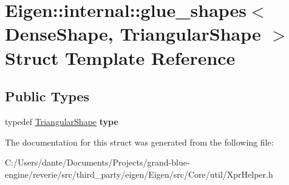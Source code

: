 \hypertarget{struct_eigen_1_1internal_1_1glue__shapes_3_01_dense_shape_00_01_triangular_shape_01_4}{}\section{Eigen\+::internal\+::glue\+\_\+shapes$<$ Dense\+Shape, Triangular\+Shape $>$ Struct Template Reference}
\label{struct_eigen_1_1internal_1_1glue__shapes_3_01_dense_shape_00_01_triangular_shape_01_4}
\subsection*{Public Types}
\begin{DoxyCompactItemize}
\item 
\mbox{\label{struct_eigen_1_1internal_1_1glue__shapes_3_01_dense_shape_00_01_triangular_shape_01_4_a659c56d0a32aac0772b3605c5fa488db}} 
typedef \mbox{\hyperlink{struct_eigen_1_1_triangular_shape}{Triangular\+Shape}} {\bfseries type}
\end{DoxyCompactItemize}


The documentation for this struct was generated from the following file\+:\begin{DoxyCompactItemize}
\item 
C\+:/\+Users/dante/\+Documents/\+Projects/grand-\/blue-\/engine/reverie/src/third\+\_\+party/eigen/\+Eigen/src/\+Core/util/Xpr\+Helper.\+h\end{DoxyCompactItemize}
